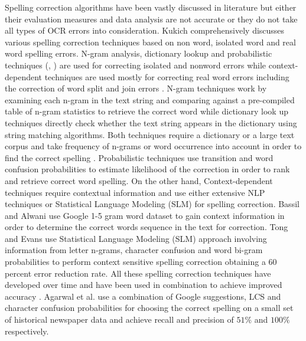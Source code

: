 Spelling correction algorithms have been vastly discussed in literature but either their evaluation measures and data analysis are not accurate or they do not take all types of OCR errors into consideration.
Kukich\cite{kukich1992techniques} comprehensively discusses various spelling correction techniques based on non word, isolated word and real word spelling errors. N-gram analysis, dictionary lookup and probabilistic techniques (\cite{strohmaier2003lexical}, \cite{ringlstetter2007text}) are used for correcting isolated and nonword errors while context-dependent techniques are used mostly for correcting real word errors including the correction of word split and join errors \cite{elmi1998spelling}.
N-gram techniques work by examining each n-gram in the text string and comparing against a pre-compiled table of n-gram statistics to retrieve the correct word while dictionary look up techniques directly check whether the text string appears in the dictionary using string matching algorithms. Both techniques require a dictionary or a large text corpus and take frequency of n-grams or word occurrence into account in order to find the correct spelling .
Probabilistic techniques use transition and word confusion probabilities to estimate likelihood of the correction in order to rank and retrieve correct word spelling.
On the other hand, Context-dependent techniques require contextual information and use either extensive NLP techniques or Statistical Language Modeling (SLM) for spelling correction.
Bassil and Alwani\cite{bassil2012ocr} use Google 1-5 gram word dataset to gain context information in order to determine the correct words sequence in the text for correction.
Tong and Evans\cite{tong1996statistical} use Statistical Language Modeling (SLM) approach involving information from letter n-grams, character confusion and word bi-gram probabilities to perform context sensitive spelling correction obtaining a 60 percent error reduction rate. All these spelling correction techniques have developed over time and have been used in combination to achieve improved accuracy \cite{brill2000improved}. Agarwal et al.\cite{agarwal2013utilizing} use a combination of Google suggestions, LCS and character confusion probabilities for choosing the correct spelling on a small set of historical newspaper data and achieve recall and precision of $51\%$ and $100\%$ respectively.

